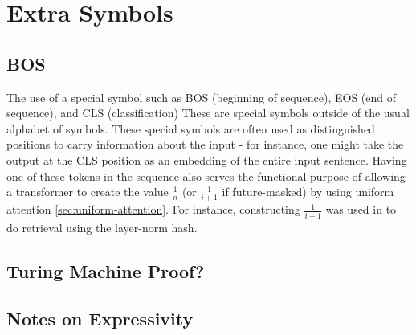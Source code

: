 \section{Extra Symbols}

\subsection{BOS}\label{sec:BOS}

The use of a special symbol such as BOS (beginning of sequence), EOS (end of sequence), and CLS (classification) These are special symbols outside of the usual alphabet of symbols. These special symbols are often used as distinguished positions to carry information about the input - for instance, one might take the output at the CLS position as an embedding of the entire input sentence. Having one of these tokens in the sequence also serves the functional purpose of allowing a transformer to create the value $\frac{1}{n}$ (or $\frac{1}{i+1}$ if future-masked) by using uniform attention \cref{sec:uniform-attention}. For instance, constructing $\frac{1}{i+1}$ was used in \citet{merrill-sabharwal-2024-cot} to do retrieval using the layer-norm hash.

\subsection{Turing Machine Proof?}


\subsection{Notes on Expressivity}

